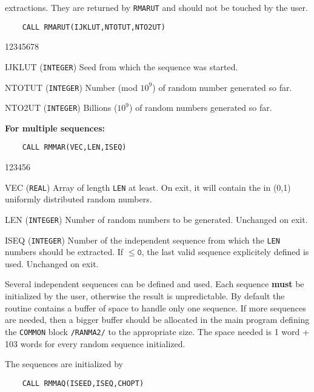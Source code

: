 extractions. They are returned by {\tt RMARUT} and should not be
touched by the user.
\begin{verbatim}
    CALL RMARUT(IJKLUT,NTOTUT,NTO2UT)
\end{verbatim}
\begin{DLtt}{12345678}
\item[IJKLUT] ({\tt INTEGER}) Seed from which the sequence
was started.
\item[NTOTUT] ({\tt INTEGER}) Number (mod $10^9$) of random number
generated so far.
\item[NTO2UT] ({\tt INTEGER}) Billions ($10^9$)
of random numbers generated so far.
\end{DLtt}
\newpage
{\bf For multiple sequences:}
\begin{verbatim}
    CALL RMMAR(VEC,LEN,ISEQ)
\end{verbatim}
\begin{DLtt}{123456}
\item[VEC] ({\tt REAL}) Array of length {\tt LEN} at least.
On exit, it will contain the in (0,1) uniformly distributed random
numbers.
\item[LEN] ({\tt INTEGER}) Number of random numbers to be generated.
Unchanged on exit.
\item[ISEQ] ({\tt INTEGER}) Number of the independent sequence from which
the {\tt LEN} numbers should be extracted. If $\mathtt{\leq 0}$, the
last valid sequence explicitely defined is used. Unchanged on exit.
\end{DLtt}
Several independent sequences can be defined and used. Each
sequence {\bf must} be initialized by the user, otherwise the result is
unpredictable. By default the routine contains a buffer of space to
handle only one sequence. If more sequences are needed, then a bigger
buffer should be allocated in the main program defining the {\tt COMMON}
block {\tt /RANMA2/} to the appropriate size. The space needed is 1 word
+ 103 words for every random sequence initialized.
\par
The sequences are initialized by
\begin{verbatim}
    CALL RMMAQ(ISEED,ISEQ,CHOPT)
\end{verbatim}
